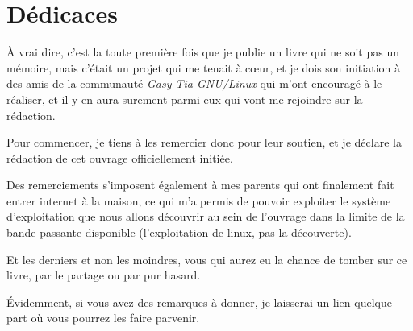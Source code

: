 \section*{Dédicaces}

À vrai dire, c'est la toute première fois que je publie un livre qui ne soit
pas un mémoire, mais c'était un projet qui me tenait à c\oe{}ur, et je dois son
initiation à des amis de la communauté \emph{Gasy Tia GNU/Linux} qui m'ont
encouragé à le réaliser, et il y en aura surement parmi eux qui vont me rejoindre
sur la rédaction.

Pour commencer, je tiens à les remercier donc pour leur soutien, et je déclare
la rédaction de cet ouvrage officiellement initiée.

Des remerciements s'imposent également à mes parents qui ont finalement fait
entrer internet à la maison, ce qui m'a permis de pouvoir exploiter le système
d'exploitation que nous allons découvrir au sein de l'ouvrage dans la limite de
la bande passante disponible (l'exploitation de linux, pas la découverte).

Et les derniers et non les moindres, vous qui aurez eu la chance de tomber sur
ce livre, par le partage ou par pur hasard.

Évidemment, si vous avez des remarques à donner, je laisserai un lien quelque
part où vous pourrez les faire parvenir.

